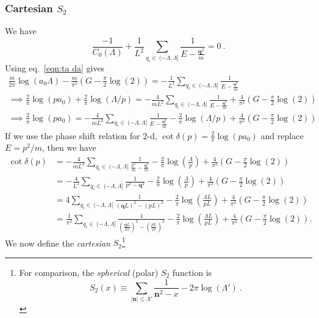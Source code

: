 \subsubsection{Cartesian $S_2$}
We have
\begin{equation}
 \frac{-1}{C_{0}(\Lambda)}+\frac{1}{L^2}\sum_{q_i\in\ (-\Lambda,\Lambda]}\frac { 1 } { E - \frac{\bm{q}^2}{m} }=0\ .
 \end{equation}
 Using eq.~\eqref{eqn:ta da} gives
\begin{multline}
\frac{m}{2\pi}\log\left(a_0\Lambda\right)-\frac{m}{\pi^2}\left(G-\frac{\pi }{2}\log(2)\right)=-\frac{1}{L^2}\sum_{q_i\in\ (-\Lambda,\Lambda]} \frac { 1 } { E - \frac{\bm{q}^2}{m} }\\
\implies
\frac{2}{\pi}\log (pa_0)+\frac{2}{\pi}\log(\Lambda/p)=-\frac{4}{mL^2}\sum_{q_i\in\ (-\Lambda,\Lambda]}  \frac { 1 } { E - \frac{\bm{q}^2}{m} }+\frac{4}{\pi^2}\left(G-\frac{\pi}{2}\log(2)\right)\\
\implies
\frac{2}{\pi}\log (pa_0)=-\frac{4}{mL^2}\sum_{q_i\in\ (-\Lambda,\Lambda]}  \frac { 1 } { E - \frac{\bm{q}^2}{m} }-\frac{2}{\pi}\log(\Lambda/p)+\frac{4}{\pi^2}\left(G-\frac{\pi}{2}\log(2)\right)
\end{multline}
If we use the phase shift relation for 2-d, $\cot\delta(p)=\frac{2}{\pi}\log (pa_0)$ and replace $E=p^2/m$, then we have
\begin{align}
\cot\delta(p)&=-\frac{4}{mL^2}\sum_{q_i\in\ (-\Lambda,\Lambda]}  \frac { 1 } { \frac{p^2}{m} - \frac{\bm{q}^2}{m} }-\frac{2}{\pi}\log\left(\frac{\Lambda}{p}\right)+\frac{4}{\pi^2}\left(G-\frac{\pi }{2}\log(2)\right)\\
&=-\frac{4}{L^2}\sum_{q_i\in\ (-\Lambda,\Lambda]}  \frac { 1 } {p^2 - \bm{q}^2 }-\frac{2}{\pi}\log\left(\frac{\Lambda}{p}\right)+\frac{4}{\pi^2}\left(G-\frac{\pi }{2}\log(2)\right)\\
&=4\sum_{q_i\in\ (-\Lambda,\Lambda]}  \frac { 1 } {(\bm{q}L)^2-(pL)^2 }-\frac{2}{\pi}\log\left(\frac{\Lambda L}{pL}\right)+\frac{4}{\pi^2}\left(G-\frac{\pi }{2}\log(2)\right)\\
&=\frac{1}{\pi^2}\sum_{q_i\in\ (-\Lambda,\Lambda]}  \frac { 1 } {\left(\frac{\bm{q}L}{2\pi}\right)^2-\left(\frac{pL}{2\pi}\right)^2 }-\frac{2}{\pi}\log\left(\frac{\Lambda L}{pL}\right)+\frac{4}{\pi^2}\left(G-\frac{\pi }{2}\log(2)\right).
\end{align}
We now define the \emph{cartesian} $S_2$\label{eqn:S2}\footnote{For comparison, the \emph{spherical} (polar) $S_2$ function is
\begin{equation}\label{eqn:S2 polar}
S_2(x)\equiv\sum_{|\bm n|\le\Lambda'}\frac { 1 } { \bm{n}^2 -x}-2\pi\log\left(\Lambda'\right)\ .
\end{equation}}
